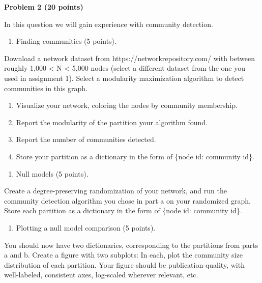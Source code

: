 \documentclass[11pt]{article}
\providecommand{\tightlist}{%
      \setlength{\itemsep}{0pt}\setlength{\parskip}{0pt}}
\begin{document}
\begin{problemstmt}
\textbf{Problem 2 (20 points)}

In this question we will gain experience with community detection.

\begin{enumerate}
\def\labelenumi{(\alph{enumi})}
\tightlist
\item
  Finding communities (5 points).
\end{enumerate}

Download a network dataset from https://networkrepository.com/ with
between roughly 1,000 \textless{} N \textless{} 5,000 nodes (select a
different dataset from the one you used in assignment 1). Select a
modularity maximization algorithm to detect communities in this graph.

\begin{enumerate}
\def\labelenumi{(\roman{enumi})}
\item
  Visualize your network, coloring the nodes by community membership.
\item
  Report the modularity of the partition your algorithm found.
\item
  Report the number of communities detected.
\item
  Store your partition as a dictionary in the form of \{node id:
  community id\}.
\end{enumerate}

\begin{enumerate}
\def\labelenumi{(\alph{enumi})}
\setcounter{enumi}{1}
\tightlist
\item
  Null models (5 points).
\end{enumerate}

Create a degree-preserving randomization of your network, and run the
community detection algorithm you chose in part a on your randomized
graph. Store each partition as a dictionary in the form of \{node id:
community id\}.

\begin{enumerate}
\def\labelenumi{(\alph{enumi})}
\setcounter{enumi}{2}
\tightlist
\item
  Plotting a null model comparison (5 points).
\end{enumerate}

You should now have two dictionaries, corresponding to the partitions
from parts a and b. Create a figure with two subplots: In each, plot the
community size distribution of each partition. Your figure should be
publication-quality, with well-labeled, consistent axes, log-scaled
wherever relevant, etc.


\end{problemstmt}
\end{document}

